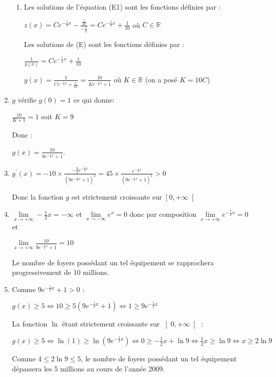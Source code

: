 \begin{corrige}
\begin{enumerate}
\begin{enumerate}[label=\alph*.]
               \item
               Les solutions de l'équation (E1) sont les fonctions définies par :
               \par
               $z\left(x\right)=Ce^{-\frac{1}{2}x}-\frac{\frac{1}{20}}{-\frac{1}{2}}=Ce^{-\frac{1}{2}x}+\frac{1}{10}$ où $C \in \mathbb{R}$
               \par
               Les solutions de (E) sont les fonctions définies par :
               \par
               $\frac{1}{y\left(x\right)}=Ce^{-\frac{1}{2}x}+\frac{1}{10}$
               \par
               $y\left(x\right)=\frac{1}{Ce^{-\frac{1}{2}x}+\frac{1}{10}}=\frac{10}{Ke^{-\frac{1}{2}x}+1}$ où $K \in \mathbb{R}$ (on a posé $K=10C$)
          \end{enumerate}
          \item
          $g$ vérifie $g\left(0\right)=1$ ce qui donne:
          \par
          $\frac{10}{K+1}=1$ soit $K=9$
          \par
          Donc :
          \par
          $g\left(x\right)=\frac{10}{9e^{-\frac{1}{2}x}+1}$.
          \item
          $g^{\prime}\left(x\right)=-10\times \frac{-\frac{9}{2}e^{-\frac{1}{2}x}}{\left(9e^{-\frac{1}{2}x}+1\right)^{2}}=45\times \frac{e^{-\frac{1}{2}x}}{\left(9e^{-\frac{1}{2}x}+1\right)^{2}} > 0$
          \par
          Donc la fonction $g$ est strictement croissante sur $\left[0,+\infty \right[$
          \item
          $\lim\limits_{x\rightarrow +\infty } -\frac{1}{2}x=-\infty $ et $\lim\limits_{x\rightarrow -\infty } e^{x}=0$ donc par composition $\lim\limits_{x\rightarrow +\infty }e^{-\frac{1}{2}x}=0$ et
          \par
          $\lim\limits_{x\rightarrow +\infty }\frac{10}{9e^{-\frac{1}{2}x}+1}=10$
          \par
          Le nombre de foyers possédant un tel équipement se rapprochera progressivement de 10 millions.
          \item
          Comme $9e^{-\frac{1}{2}x}+1 > 0$ :
          \par
          $g\left(x\right)\geqslant 5 \Leftrightarrow  10\geqslant 5\left(9e^{-\frac{1}{2}x}+1\right) \Leftrightarrow  1\geqslant 9e^{-\frac{1}{2}x} $
          \par
          La fonction $\ln$ étant strictement croissante sur $\left]0,+\infty \right[$ :
          \par
          $g\left(x\right)\geqslant 5 \Leftrightarrow  \ln\left(1\right)\geqslant \ln\left(9e^{-\frac{1}{2}x}\right) \Leftrightarrow  0\geqslant -\frac{1}{2}x+\ln9 \Leftrightarrow  \frac{1}{2}x\geqslant \ln9 \Leftrightarrow  x\geqslant 2\ln9$
          \par
          Comme $4\leqslant 2\ln9\leqslant 5$, le nombre de foyers possédant un tel équipement dépassera les 5 millions au cours de l'année 2009.
     \end{enumerate}
\end{corrige}
